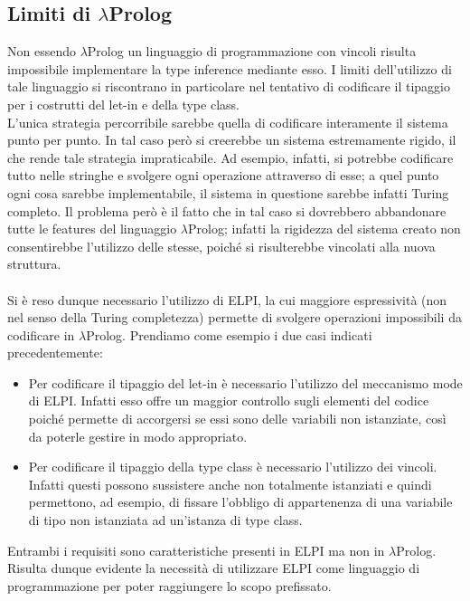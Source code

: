 \documentclass[12pt,a4paper,openright,twoside]{report}
\begin{document}
\subsection{Limiti di $\lambda$Prolog}
Non essendo $\lambda$Prolog un linguaggio di programmazione con vincoli risulta impossibile implementare la type inference mediante esso. I limiti dell'utilizzo di tale linguaggio si riscontrano in particolare nel tentativo di codificare il tipaggio per i costrutti del let-in e della type class.\\
L'unica strategia percorribile sarebbe quella di codificare interamente il sistema punto per punto. In tal caso però si creerebbe un sistema estremamente rigido, il che rende tale strategia impraticabile. Ad esempio, infatti, si potrebbe codificare tutto nelle stringhe e svolgere ogni operazione attraverso di esse; a quel punto ogni cosa sarebbe implementabile, il sistema in questione sarebbe infatti Turing completo. Il problema però è il fatto che in tal caso si dovrebbero abbandonare tutte le features del linguaggio $\lambda$Prolog; infatti la rigidezza del sistema creato non consentirebbe l'utilizzo delle stesse, poiché si risulterebbe vincolati alla nuova struttura.

\paragraph{}
Si è reso dunque necessario l'utilizzo di ELPI, la cui maggiore espressività (non nel senso della Turing completezza) permette di svolgere operazioni impossibili da codificare in $\lambda$Prolog. Prendiamo come esempio i due casi indicati precedentemente:
\begin{itemize}
 \item Per codificare il tipaggio del let-in è necessario l'utilizzo del meccanismo mode di ELPI. Infatti esso offre un maggior controllo sugli elementi del codice poiché permette di accorgersi se essi sono delle variabili non istanziate, così da poterle gestire in modo appropriato.
 \item Per codificare il tipaggio della type class è necessario l'utilizzo dei vincoli. Infatti questi possono sussistere anche non totalmente istanziati e quindi permettono, ad esempio, di fissare l'obbligo di appartenenza di una variabile di tipo non istanziata ad un'istanza di type class.
\end{itemize}
Entrambi i requisiti sono caratteristiche presenti in ELPI ma non in $\lambda$Prolog. Risulta dunque evidente la necessità di utilizzare ELPI come linguaggio di programmazione per poter raggiungere lo scopo prefissato.
\end{document}
